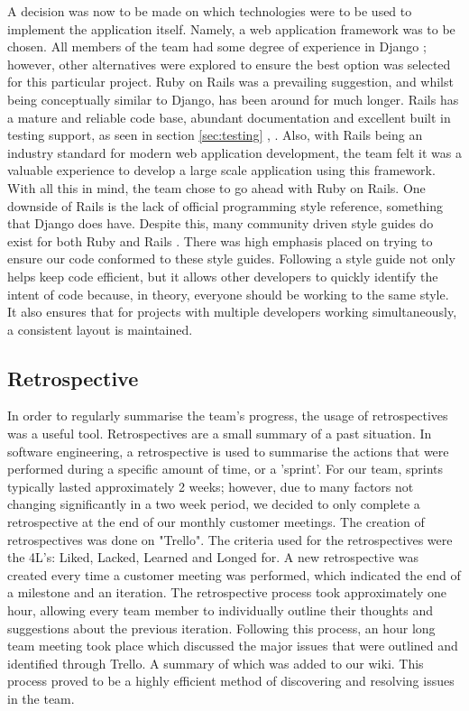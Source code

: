 \documentclass{l3proj}
\begin{document}
A decision was now to be made on which technologies were to be used to implement the application itself. Namely, a web application framework was to be chosen. All members of the team had some degree of experience in Django \cite{Django}; however, other alternatives were explored to ensure the best option was selected for this particular project. Ruby on Rails was a prevailing suggestion, and whilst being conceptually similar to Django, has been around for much longer. Rails has a mature and reliable code base, abundant documentation and excellent built in testing support, as seen in section \ref{sec:testing} \cite{Rails}, \cite{DjangoVsRails}. Also, with Rails being an industry standard for modern web application development, the team felt it was a valuable experience to develop a large scale application using this framework. With all this in mind, the team chose to go ahead with Ruby on Rails. One downside of Rails is the lack of official programming style reference, something that Django does have. Despite this, many community driven style guides do exist for both Ruby \cite{rubyStyle} and Rails \cite{railsStyle}. There was high emphasis placed on trying to ensure our code conformed to these style guides. Following a style guide not only helps keep code efficient, but it allows other developers to quickly identify the intent of code because, in theory, everyone should be working to the same style. It also ensures that for projects with multiple developers working simultaneously, a consistent layout is maintained. 

\subsection{Retrospective}
\label{retrospective}

In order to regularly summarise the team's progress, the usage of retrospectives was a useful tool. Retrospectives are a small summary of a past situation. In software engineering, a retrospective is used to summarise the actions that were performed during a specific amount of time, or a 'sprint'. For our team, sprints typically lasted approximately 2 weeks; however, due to many factors not changing significantly in a two week period, we decided to only complete a retrospective at the end of our monthly customer meetings. The creation of retrospectives was done on "Trello". The criteria used for the retrospectives were the 4L's: Liked, Lacked, Learned and Longed for. A new retrospective was created every time a customer meeting was performed, which indicated the end of a milestone and an iteration. The retrospective process took approximately one hour, allowing every team member to individually outline their thoughts and suggestions about the previous iteration. Following this process, an hour long team meeting took place which discussed the major issues that were outlined and identified through Trello. A summary of which was added to our wiki. This process proved to be a highly efficient method of discovering and resolving issues in the team.
\end{document}
